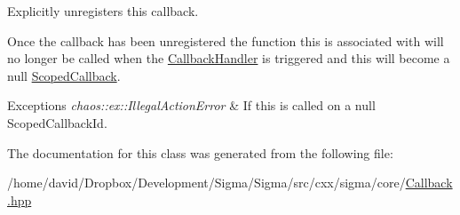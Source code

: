 Explicitly unregisters this callback. 

Once the callback has been unregistered the function this is associated with will no longer be called when the \hyperlink{classsigma_1_1core_1_1_callback_handler}{Callback\-Handler} is triggered and this will become a null \hyperlink{classsigma_1_1core_1_1_scoped_callback}{Scoped\-Callback}.


\begin{DoxyExceptions}{Exceptions}
{\em chaos\-::ex\-::\-Illegal\-Action\-Error} & If this is called on a null Scoped\-Callback\-Id. \\
\hline
\end{DoxyExceptions}


The documentation for this class was generated from the following file\-:\begin{DoxyCompactItemize}
\item 
/home/david/\-Dropbox/\-Development/\-Sigma/\-Sigma/src/cxx/sigma/core/\hyperlink{_callback_8hpp}{Callback.\-hpp}\end{DoxyCompactItemize}
